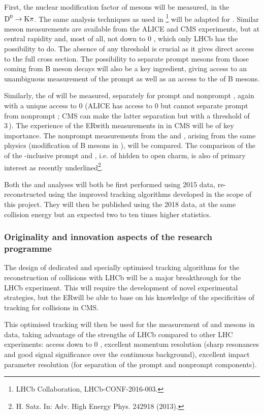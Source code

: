 \documentclass[a4paper,11pt]{article}
\newcommand{\ER}{ER}
\begin{document}
First, the nuclear modification factor of \Dz mesons will be measured, in the $\text{D}^0 \to \text{K}\pi$. The same analysis techniques as used in \pPb\footnote{LHCb Collaboration, LHCb-CONF-2016-003.} will be adapted for \pbpb. Similar \Dz meson measurements are available from the ALICE and CMS experiments, but at central rapidity and, most of all, not down to 0 \pt, which only LHCb has the possibility to do. The absence of any \pt threshold is crucial as it gives direct access to the full cross section. The possibility to separate
prompt \Dz mesons from those coming from B meson decays will also be a key ingredient, giving access to an unambiguous measurement of the prompt \Dz as well as an access to the \raa
of B mesons.

Similarly, the \raa of \Jpsi will be measured, separately for prompt and nonprompt \Jpsi, again with a unique access to 0 \pt (ALICE has access to 0 \pt \Jpsi but cannot separate prompt from nonprompt \Jpsi; CMS can make the latter separation but with a \pt threshold of 3\,\GeVc). The experience of the \ER with \Jpsi measurements in \pbpb
in CMS will be of key importance. The nonprompt measurements from the \Dz and \Jpsi, arising from the same physics (modification of B mesons in \pbpb), will be compared. The comparison of the \raa of the \pt-inclusive prompt \Jpsi and \Dz, i.e. of hidden to open charm, is also of primary interest as recently underlined\footnote{H. Satz. In: Adv. High Energy Phys. 242918 (2013).}.

Both the \Dz and \Jpsi analyses will both be first performed using 2015 \pbpb data, re-reconstructed using the improved tracking algorithms developed in the scope of this project. They will then be published using the 2018 data, at the same collision energy but an expected two to ten times higher statistics.


\subsubsection{Originality and innovation aspects of the research programme}

The design of dedicated and specially optimised tracking algorithms for the reconstruction of \pbpb collisions with LHCb will be a major breakthrough for the LHCb experiment. This will require the development of novel experimental strategies, but the \ER will be able to base on his knowledge of the specificities of tracking for \pbpb collisions in CMS.

This optimised tracking will then be used for the measurement of \Dz and \Jpsi mesons in \pbpb data, taking advantage of the strengths of LHCb compared to other LHC experiments: access down to 0 \pt, excellent momentum resolution (sharp resonances and good signal significance over the continuous background), excellent impact parameter resolution (for separation of the prompt and nonprompt components).
\end{document}
